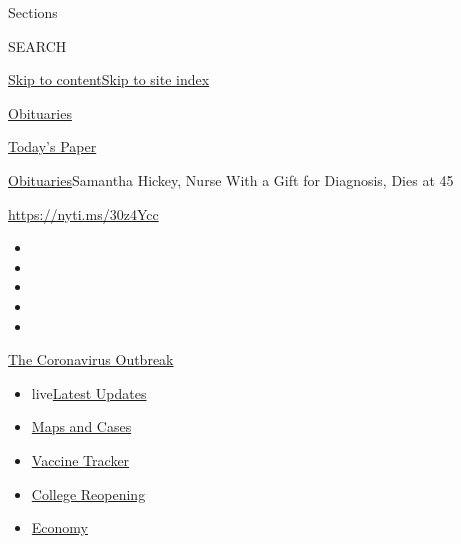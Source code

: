 Sections

SEARCH

\protect\hyperlink{site-content}{Skip to
content}\protect\hyperlink{site-index}{Skip to site index}

\href{https://www.nytimes.com/section/obituaries}{Obituaries}

\href{https://myaccount.nytimes.com/auth/login?response_type=cookie\&client_id=vi}{}

\href{https://www.nytimes.com/section/todayspaper}{Today's Paper}

\href{/section/obituaries}{Obituaries}\textbar{}Samantha Hickey, Nurse
With a Gift for Diagnosis, Dies at 45

\url{https://nyti.ms/30z4Ycc}

\begin{itemize}
\item
\item
\item
\item
\item
\end{itemize}

\href{https://www.nytimes.com/news-event/coronavirus?action=click\&pgtype=Article\&state=default\&region=TOP_BANNER\&context=storylines_menu}{The
Coronavirus Outbreak}

\begin{itemize}
\tightlist
\item
  live\href{https://www.nytimes.com/2020/08/03/world/coronavirus-covid-19.html?action=click\&pgtype=Article\&state=default\&region=TOP_BANNER\&context=storylines_menu}{Latest
  Updates}
\item
  \href{https://www.nytimes.com/interactive/2020/us/coronavirus-us-cases.html?action=click\&pgtype=Article\&state=default\&region=TOP_BANNER\&context=storylines_menu}{Maps
  and Cases}
\item
  \href{https://www.nytimes.com/interactive/2020/science/coronavirus-vaccine-tracker.html?action=click\&pgtype=Article\&state=default\&region=TOP_BANNER\&context=storylines_menu}{Vaccine
  Tracker}
\item
  \href{https://www.nytimes.com/2020/08/02/us/covid-college-reopening.html?action=click\&pgtype=Article\&state=default\&region=TOP_BANNER\&context=storylines_menu}{College
  Reopening}
\item
  \href{https://www.nytimes.com/live/2020/08/03/business/stock-market-today-coronavirus?action=click\&pgtype=Article\&state=default\&region=TOP_BANNER\&context=storylines_menu}{Economy}
\end{itemize}

